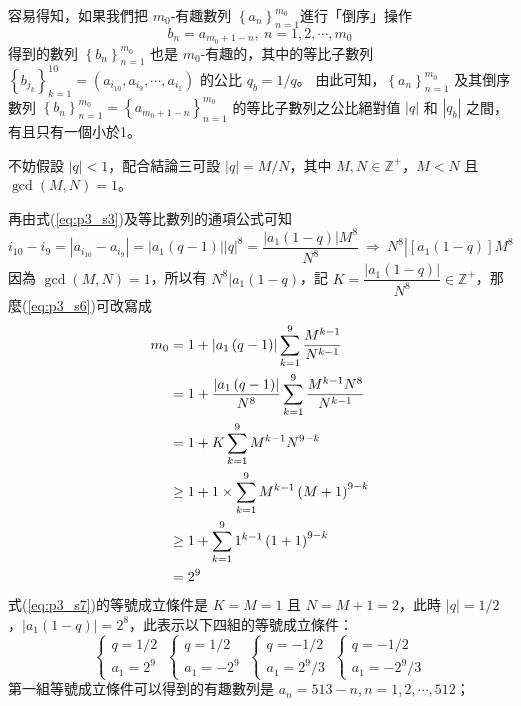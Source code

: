 \documentclass{article}
\begin{document}
容易得知，如果我們把 $m_0$-有趣數列 $\left\{a_n\right\}_{n=1}^{m_0}$進行「倒序」操作
$$
  b_n=a_{m_0+1-n},\ n=1,2,\cdots,m_0
$$
得到的數列 $\left\{b_n\right\}_{n=1}^{m_0}$ 也是 $m_0$-有趣的，其中的等比子數列 $\left\{b_{j_k}\right\}_{k=1}^{10}=\left(a_{i_{10}},a_{i_9},\cdots,a_{i_1}\right)$ 的公比 $q_b = 1/q$。
由此可知，$\left\{a_n\right\}_{n=1}^{m_0}$ 及其倒序數列 $\left\{b_n\right\}_{n=1}^{m_0}=\left\{a_{m_0+1-n}\right\}_{n=1}^{m_0}$ 的等比子數列之公比絕對值 $|q|$ 和 $|q_b|$ 之間，有且只有一個小於1。

不妨假設 $|q|<1$，配合結論三可設 $|q|=M/N$，其中 $M,N\in\mathbb{Z}^+$，$M<N$ 且 $\gcd\left(M,N\right)=1$。

再由式(\ref{eq:p3_s3})及等比數列的通項公式可知
\begin{equation}
  i_{10}-i_9=\left|a_{i_{10}}-a_{i_9}\right|=\left|a_1\left(q-1\right)\right|\left|q\right|^8=\frac{\left|a_1\left(1-q\right)\right|M^8}{N^8}\ \Rightarrow\ N^8\left|\left[a_1\left(1-q\right)\right]M^8\right.
\end{equation}
因為 $\gcd\left(M,N\right)=1$，所以有 $N^8|a_1\left(1-q\right)$，記 $K=\dfrac{\left|a_1\left(1-q\right)\right|}{N^8}\in\mathbb{Z}^+$，那麼(\ref{eq:p3_s6})可改寫成
\begin{align}
  m_0&=1+\left|a_1\left(q-1\right)\right|\sum_{k=1}^{9}{\frac{M^{k-1}}{N^{k-1}}}\notag\\
  &=1+\frac{\left|a_1\left(q-1\right)\right|}{N^8}\sum_{k=1}^{9}{\frac{M^{k-1}N^8}{N^{k-1}}}\notag\\
  &=1+K\sum_{k=1}^{9}{M^{k-1}N^{9-k}}\notag\\
  &\geq1+1\times\sum_{k=1}^{9}{M^{k-1}\left(M+1\right)^{9-k}}\notag\\
  &\geq1+\sum_{k=1}^{9}{1^{k-1}\left(1+1\right)^{9-k}}\notag\\
  &=2^9\label{eq:p3_s7}
\end{align}
式(\ref{eq:p3_s7})的等號成立條件是 $K=M=1$ 且 $N=M+1=2$，此時 $|q|=1/2$，$|a_1\left(1-q\right)|=2^8$，此表示以下四組的等號成立條件：
\begin{equation}
  \left\{\begin{matrix}
    q=1/2\\
    a_1=2^9
  \end{matrix}\right.\ 
  \left\{\begin{matrix}
    q=1/2\\
    a_1=-2^9
  \end{matrix}\right.\ 
  \left\{\begin{matrix}
    q=-1/2\\
    a_1=2^9/3
  \end{matrix}\right.\ 
  \left\{\begin{matrix}
    q=-1/2\\
    a_1=-2^9/3
  \end{matrix}\right.
\end{equation}
第一組等號成立條件可以得到的有趣數列是 $a_n=513-n, n=1,2,\cdots,512$；
\end{document}
